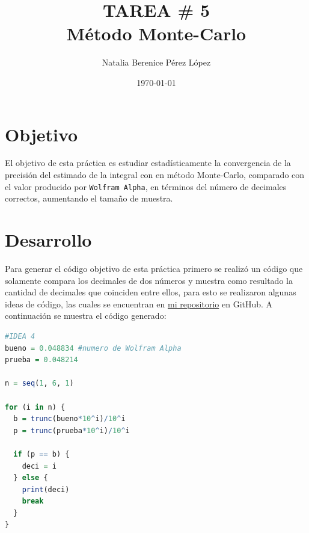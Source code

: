 \documentclass{article}
\title{TAREA \# 5 \\ Método Monte-Carlo} %
\author{Natalia Berenice P\'{e}rez L\'{o}pez} %
\date{\today}
\begin{document}

\maketitle %

\section{Objetivo}
El objetivo de esta práctica es estudiar estadísticamente la convergencia de la precisión del estimado de la integral con en método Monte-Carlo, comparado con el valor producido por \texttt{Wolfram Alpha}, en términos del número de decimales correctos, aumentando el tamaño de muestra.

\section{Desarrollo} %
Para generar el código objetivo de esta práctica primero se realizó un código que solamente compara los decimales de dos números y muestra como resultado la cantidad de decimales que coinciden entre ellos, para esto se realizaron algunas ideas de código, las cuales se encuentran en \href{https://github.com/nataliaperez0/Simulation/tree/main/Tarea5}{mi repositorio}  en GitHub. A continuación se muestra el código generado: 



\lstset{style=mystyle}
\begin{lstlisting}[language=R, caption= Código para obtener la cantidad de decimales que coinciden entre dos números.]
#IDEA 4
bueno = 0.048834 #numero de Wolfram Alpha
prueba = 0.048214

n = seq(1, 6, 1)

for (i in n) {
  b = trunc(bueno*10^i)/10^i
  p = trunc(prueba*10^i)/10^i
  
  if (p == b) {
    deci = i
  } else {
    print(deci)
    break
  }
}
\end{lstlisting}
\end{document}
